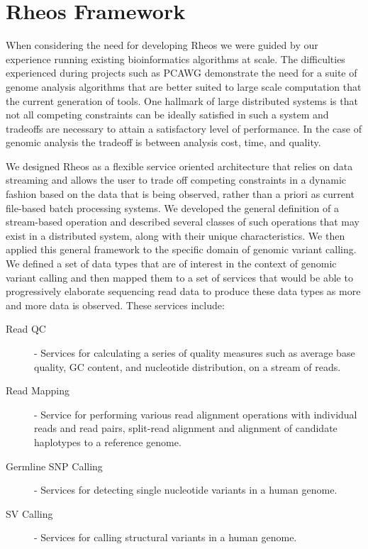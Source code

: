 \section{Rheos Framework}

When considering the need for developing Rheos we were guided by our experience running existing bioinformatics algorithms at scale. The difficulties experienced during projects such as PCAWG demonstrate the need for a suite of genome analysis algorithms that are better suited to large scale computation that the current generation of tools. One hallmark of large distributed systems is that not all competing constraints can be ideally satisfied in such a system and tradeoffs are necessary to attain a satisfactory level of performance. In the case of genomic analysis the tradeoff is between analysis cost, time, and quality.

We designed Rheos as a flexible service oriented architecture that relies on data streaming and allows the user to trade off competing constraints in a dynamic fashion based on the data that is being observed, rather than a priori as current file-based batch processing systems. We developed the general definition of a stream-based operation and described several classes of such operations that may exist in a distributed system, along with their unique characteristics. We then applied this general framework to the specific domain of genomic variant calling. We defined a set of data types that are of interest in the context of genomic variant calling and then mapped them to a set of services that would be able to progressively elaborate sequencing read data to produce these data types as more and more data is observed. These services include:

\begin{description}
    \item [Read QC] - Services for calculating a series of quality measures such as average base quality, GC content, and nucleotide distribution, on a stream of reads.
    \item [Read Mapping] - Service for performing various read alignment operations with individual reads and read pairs, split-read alignment and alignment of candidate haplotypes to a reference genome.
    \item [Germline SNP Calling] - Services for detecting single nucleotide variants in a human genome.
    \item [SV Calling] - Services for calling structural variants in a human genome.
\end{description}

